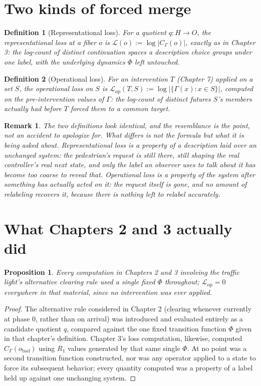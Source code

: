 \documentclass[11pt]{report}
\newtheorem{proposition}{Proposition}[chapter]
\newtheorem{definition}{Definition}[chapter]
\newtheorem{remark}{Remark}[chapter]
\begin{document}
\section*{Two kinds of forced merge}

\begin{definition}[Representational loss]
For a quotient $q : H \to O$, the representational loss at a fiber $o$
is $\mathcal{L}(o) := \log |C_\Gamma(o)|$, exactly as in Chapter 3:
the log-count of distinct continuation spaces a description choice
groups under one label, with the underlying dynamics $\Phi$ left
untouched.
\end{definition}

\begin{definition}[Operational loss]
For an intervention $T$ (Chapter 7) applied on a set $S$, the
operational loss on $S$ is $\mathcal{L}_{\mathrm{op}}(T,S) := \log
|\{\Gamma(x) : x \in S\}|$, computed on the \emph{pre-intervention}
values of $\Gamma$: the log-count of distinct futures $S$'s members
actually had before $T$ forced them to a common target.
\end{definition}

\begin{remark}
The two definitions look identical, and the resemblance is the point,
not an accident to apologize for. What differs is not the formula but
what it is being asked about. Representational loss is a property of
a description laid over an unchanged system: the pedestrian's request
is still there, still shaping the real controller's real next state,
and only the label an observer uses to talk about it has become too
coarse to reveal that. Operational loss is a property of the system
after something has actually acted on it: the request itself is gone,
and no amount of relabeling recovers it, because there is nothing
left to relabel accurately.
\end{remark}

\section*{What Chapters 2 and 3 actually did}

\begin{proposition}
\label{prop:purelyrep}
Every computation in Chapters 2 and 3 involving the traffic light's
alternative clearing rule used a single fixed $\Phi$ throughout;
$\mathcal{L}_{\mathrm{op}} = 0$ everywhere in that material, since no
intervention was ever applied.
\end{proposition}
\begin{proof}
The alternative rule considered in Chapter 2 (clearing whenever
currently at phase $0$, rather than on arrival) was introduced and
evaluated entirely as a candidate quotient $q$, compared against the
one fixed transition function $\Phi$ given in that chapter's
definition. Chapter 3's loss computation, likewise, computed
$C_\Gamma(o_{\mathrm{bad}})$ using $R_1$ values generated by that same
single $\Phi$. At no point was a second transition function
constructed, nor was any operator applied to a state to force its
subsequent behavior; every quantity computed was a property of a
label held up against one unchanging system.
\end{proof}
\end{document}
